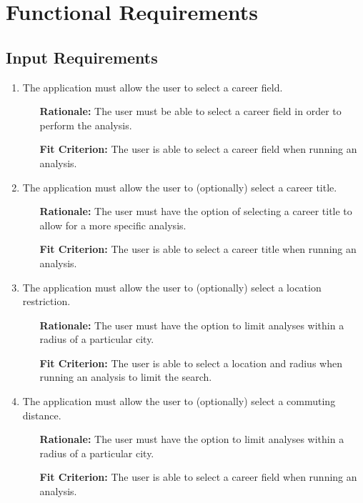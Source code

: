 \documentclass[english]{article}
\begin{document}
\section{Functional Requirements}
\label{sec:functional_requirements}

\subsection{Input Requirements}
\begin{enumerate}[\bf{FIR}1.]
	\item The application must allow the user to select a career field.
	\begin{enumerate}[leftmargin=1cm]
        \item [{\bf Rationale:}] The user must be able to select a career field in order to perform the analysis.
        \item [{\bf Fit Criterion:}] The user is able to select a career field when running an analysis.
	\end{enumerate}

    \item The application must allow the user to (optionally) select a career title.
	\begin{enumerate}[leftmargin=1cm]
        \item [{\bf Rationale:}] The user must have the option of selecting a career title to allow for a more specific analysis.
        \item [{\bf Fit Criterion:}] The user is able to select a career title when running an analysis.
	\end{enumerate}

    \item The application must allow the user to (optionally) select a location restriction.
	\begin{enumerate}[leftmargin=1cm]
        \item [{\bf Rationale:}] The user must have the option to limit analyses within a radius of a particular city.
        \item [{\bf Fit Criterion:}] The user is able to select a location and radius when running an analysis to limit the search.
	\end{enumerate}

    \item The application must allow the user to (optionally) select a commuting distance.
	\begin{enumerate}[leftmargin=1cm]
        \item [{\bf Rationale:}] The user must have the option to limit analyses within a radius of a particular city.
        \item [{\bf Fit Criterion:}] The user is able to select a career field when running an analysis.
	\end{enumerate}


\end{enumerate}
\end{document}

